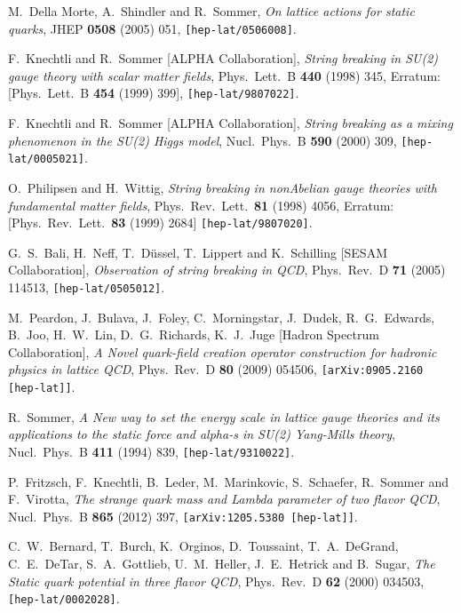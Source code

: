 \documentclass{PoS}
\begin{document}
\begin{thebibliography}{99}
  M.~Della Morte, A.~Shindler and R.~Sommer,
  \emph{On lattice actions for static quarks},
  JHEP {\bf 0508} (2005) 051,
  {\tt [hep-lat/0506008]}.

  F.~Knechtli and R.~Sommer [ALPHA Collaboration],
  \emph{String breaking in SU(2) gauge theory with scalar matter fields},
  Phys.\ Lett.\ B {\bf 440} (1998) 345,
  Erratum: [Phys.\ Lett.\ B {\bf 454} (1999) 399],
  {\tt [hep-lat/9807022]}.

  F.~Knechtli and R.~Sommer [ALPHA Collaboration],
  \emph{String breaking as a mixing phenomenon in the SU(2) Higgs model},
  Nucl.\ Phys.\ B {\bf 590} (2000) 309,
  {\tt [hep-lat/0005021]}.

  O.~Philipsen and H.~Wittig,
  \emph{String breaking in nonAbelian gauge theories with fundamental matter fields},
  Phys.\ Rev.\ Lett.\  {\bf 81} (1998) 4056,
  Erratum: [Phys.\ Rev.\ Lett.\  {\bf 83} (1999) 2684]
  {\tt [hep-lat/9807020]}.

  G.~S.~Bali, H.~Neff, T.~D{\"u}ssel, T.~Lippert and K.~Schilling [SESAM Collaboration],
  \emph{Observation of string breaking in QCD},
  Phys.\ Rev.\ D {\bf 71} (2005) 114513,
  {\tt [hep-lat/0505012]}.

  M.~Peardon, J.~Bulava, J.~Foley, C.~Morningstar, J.~Dudek, R.~G.~Edwards, B.~Joo, H.~W.~Lin, D.~G.~Richards, K.~J.~Juge [Hadron Spectrum Collaboration],
  \emph{A Novel quark-field creation operator construction for hadronic physics in lattice QCD},
  Phys.\ Rev.\ D {\bf 80} (2009) 054506,
  {\tt [arXiv:0905.2160 [hep-lat]]}.

  R.~Sommer,
  \emph{A New way to set the energy scale in lattice gauge theories and its applications to the static force and alpha-s in SU(2) Yang-Mills theory},
  Nucl.\ Phys.\ B {\bf 411} (1994) 839,
  {\tt [hep-lat/9310022]}.

  P.~Fritzsch, F.~Knechtli, B.~Leder, M.~Marinkovic, S.~Schaefer, R.~Sommer and F.~Virotta,
  \emph{The strange quark mass and Lambda parameter of two flavor QCD},
  Nucl.\ Phys.\ B {\bf 865} (2012) 397,
  {\tt [arXiv:1205.5380 [hep-lat]]}.

  C.~W.~Bernard, T.~Burch, K.~Orginos, D.~Toussaint, T.~A.~DeGrand, C.~E.~DeTar, S.~A.~Gottlieb, U.~M.~Heller, J.~E.~Hetrick and B.~Sugar,
  \emph{The Static quark potential in three flavor QCD},
  Phys.\ Rev.\ D {\bf 62} (2000) 034503,
  {\tt [hep-lat/0002028]}.


\end{thebibliography}
\end{document}
